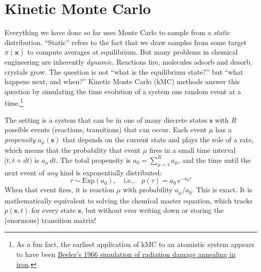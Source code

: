 \section{Kinetic Monte Carlo}
\label{sec:kmc}

Everything we have done so far uses Monte Carlo to sample from a \emph{static} distribution. ``Static'' refers to the fact that we draw samples from some target $\pi(\mathbf{x})$ to compute averages at equilibrium. But many problems in chemical engineering are inherently \emph{dynamic}. Reactions fire, molecules adsorb and desorb, crystals grow. The question is not ``what is the equilibrium state?'' but ``what happens next, and when?'' Kinetic Monte Carlo (kMC) methods answer this question by simulating the time evolution of a system one random event at a time.\footnote{As a fun fact, the earliest application of kMC to an atomistic system appears to have been \href{https://doi.org/10.1103/PhysRev.150.470}{Beeler's 1966 simulation of radiation damage annealing in iron}.}

The setting is a system that can be in one of many discrete states $\mathbf{s}$ with $R$ possible events (reactions, transitions) that can occur. Each event $\mu$ has a \emph{propensity} $a_\mu(\mathbf{s})$ that depends on the current state and plays the role of a rate, which means that the probability that event $\mu$ fires in a small time interval $[t, t+dt)$ is $a_\mu \, dt$. The total propensity is $a_0 = \sum_{\mu=1}^{R} a_\mu$, and the time until the next event of \emph{any} kind is exponentially distributed:
\begin{equation}
    \tau \sim \text{Exp}(a_0), \quad \text{i.e.,} \quad p(\tau) = a_0 \, e^{-a_0 \tau}
\end{equation}
When that event fires, it is reaction $\mu$ with probability $a_\mu / a_0$. This is exact. It is mathematically equivalent to solving the chemical master equation, which tracks $p(\mathbf{s}, t)$ for every state $\mathbf{s}$, but without ever writing down or storing the (enormous) transition matrix!

